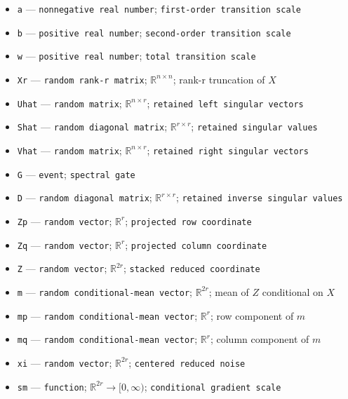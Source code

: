 \documentclass{article}
\begin{document}
\begin{itemize}
  \par\smallskip\noindent\emph{Definition.} \(\theta_n=uA^+v\)
  \item \texttt{a} --- \texttt{nonnegative real number}; \texttt{first-\allowbreak{}order transition scale}
  \item \texttt{b} --- \texttt{positive real number}; \texttt{second-\allowbreak{}order transition scale}
  \item \texttt{w} --- \texttt{positive real number}; \texttt{total transition scale}
  \item \texttt{Xr} --- \texttt{random rank-\allowbreak{}r matrix}; \(\mathbb R^{n\times n}\); rank-r truncation of \(X\)
  \item \texttt{Uhat} --- \texttt{random matrix}; \(\mathbb R^{n\times r}\); \texttt{retained left singular vectors}
  \item \texttt{Shat} --- \texttt{random diagonal matrix}; \(\mathbb R^{r\times r}\); \texttt{retained singular values}
  \item \texttt{Vhat} --- \texttt{random matrix}; \(\mathbb R^{n\times r}\); \texttt{retained right singular vectors}
  \item \texttt{G} --- \texttt{event}; \texttt{spectral gate}
  \item \texttt{D} --- \texttt{random diagonal matrix}; \(\mathbb R^{r\times r}\); \texttt{retained inverse singular values}
  \item \texttt{Zp} --- \texttt{random vector}; \(\mathbb R^r\); \texttt{projected row coordinate}
  \item \texttt{Zq} --- \texttt{random vector}; \(\mathbb R^r\); \texttt{projected column coordinate}
  \item \texttt{Z} --- \texttt{random vector}; \(\mathbb R^{2r}\); \texttt{stacked reduced coordinate}
  \item \texttt{m} --- \texttt{random conditional-\allowbreak{}mean vector}; \(\mathbb R^{2r}\); mean of \(Z\) conditional on \(X\)
  \item \texttt{mp} --- \texttt{random conditional-\allowbreak{}mean vector}; \(\mathbb R^r\); row component of \(m\)
  \item \texttt{mq} --- \texttt{random conditional-\allowbreak{}mean vector}; \(\mathbb R^r\); column component of \(m\)
  \item \texttt{xi} --- \texttt{random vector}; \(\mathbb R^{2r}\); \texttt{centered reduced noise}
  \item \texttt{sm} --- \texttt{function}; \(\mathbb R^{2r}\to[0,\infty)\); \texttt{conditional gradient scale}

\end{itemize}
\end{document}
